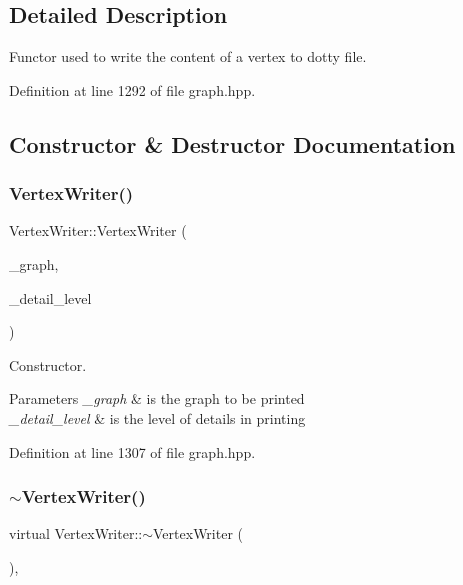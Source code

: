 \subsection{Detailed Description}
Functor used to write the content of a vertex to dotty file. 

Definition at line 1292 of file graph.\+hpp.



\subsection{Constructor \& Destructor Documentation}
\mbox{\label{classVertexWriter_a31937ec147215fe54c5ad3271799d965}} 
\subsubsection{\texorpdfstring{Vertex\+Writer()}{VertexWriter()}}
{\footnotesize\ttfamily Vertex\+Writer\+::\+Vertex\+Writer (\begin{DoxyParamCaption}\item[{const \hyperlink{structgraph}{graph} $\ast$}]{\+\_\+graph,  }\item[{const int}]{\+\_\+detail\+\_\+level }\end{DoxyParamCaption})\hspace{0.3cm}{\ttfamily [inline]}}



Constructor. 


\begin{DoxyParams}{Parameters}
{\em \+\_\+graph} & is the graph to be printed \\
\hline
{\em \+\_\+detail\+\_\+level} & is the level of details in printing \\
\hline
\end{DoxyParams}


Definition at line 1307 of file graph.\+hpp.

\mbox{\label{classVertexWriter_a226773b6df8099770a64e3f66aaeddef}} 
\subsubsection{\texorpdfstring{$\sim$\+Vertex\+Writer()}{~VertexWriter()}}
{\footnotesize\ttfamily virtual Vertex\+Writer\+::$\sim$\+Vertex\+Writer (\begin{DoxyParamCaption}{ }\end{DoxyParamCaption})\hspace{0.3cm}{\ttfamily [inline]}, {\ttfamily [virtual]}}



